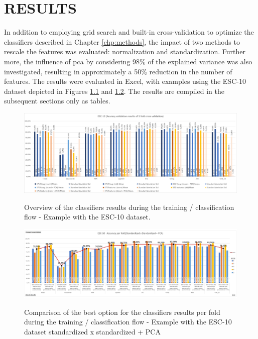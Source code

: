 \chapter{RESULTS}
\label{chp:results}

In addition to employing grid search and built-in cross-validation to optimize the classifiers described in Chapter \ref{chp:methods}, the impact of two methods to rescale the features was evaluated: normalization and standardization. Further more, the influence of \gls{pca} by considering 98\% of the explained variance was also investigated, resulting in approximately a 50\% reduction in the number of features. The results were evaluated in Excel, with examples using the ESC-10 dataset depicted in Figures \ref{fig:results_ESC-10_classification_results_overview} and \ref{fig:results_ESC-10_classification_results_fold_overview}. The results are compiled in the subsequent sections only as tables.

\begin{figure}[htbp]
    \raggedright
        \caption{Overview of the classifiers results during the training / classification flow - Example with the ESC-10 dataset.}
        \includegraphics[width=1\textwidth]{resources/images/060-results/Results_classification_flow_ESC-10_1.png}
        \label{fig:results_ESC-10_classification_results_overview}
\end{figure}

\begin{figure}[htbp]
    \raggedright
        \caption{Comparison of the best option for the classifiers results per fold during the training / classification flow - Example with the ESC-10 dataset standardized x standardized + PCA}
        \includegraphics[width=1\textwidth]{resources/images/060-results/Results_classification_flow_ESC-10_2.png}
        \label{fig:results_ESC-10_classification_results_fold_overview}
\end{figure}



